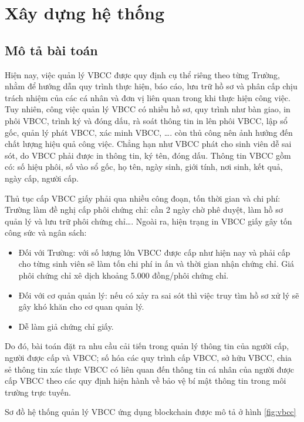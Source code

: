 \chapter{Xây dựng hệ thống}

\section{Mô tả bài toán}

Hiện nay, việc quản lý VBCC được quy định cụ thể riêng theo từng Trường, nhằm để hướng dẫn quy trình thực hiện, báo cáo, lưu trữ hồ sơ và phân cấp chịu trách nhiệm của các cá nhân và đơn vị liên quan trong khi thực hiện công việc.
Tuy nhiên, công việc quản lý VBCC có nhiều hồ sơ, quy trình như bàn giao, in phôi VBCC, trình ký và đóng dấu, rà soát thông tin in lên phôi VBCC, lập sổ gốc, quản lý phát VBCC, xác minh VBCC, \ldots. còn thủ công nên ảnh hưởng đến chất lượng hiệu quả công việc.
Chẳng hạn như VBCC phát cho sinh viên dễ sai sót, do VBCC phải được in thông tin, ký tên, đóng dấu. Thông tin VBCC gồm có: số hiệu phôi, số vào sổ gốc, họ tên, ngày sinh, giới tính, nơi sinh, kết quả, ngày cấp, người cấp. 

Thủ tục cấp VBCC giấy phải qua nhiều công đoạn, tốn thời gian và chi phí: Trường làm đề nghị cấp phôi chứng chỉ: cần 2 ngày chờ phê duyệt, làm hồ sơ quản lý và lưu trữ phôi chứng chỉ\ldots.
Ngoài ra, hiện trạng in VBCC giấy gây tốn công sức và ngân sách:
\begin{itemize}
    \item Đối với Trường: với số lượng lớn VBCC được cấp như hiện nay và phải cấp cho từng sinh viên sẽ làm tốn chi phí in ấn và thời gian nhận chứng chỉ. Giá phôi chứng chỉ xê dịch khoảng 5.000 đồng/phôi chứng chỉ.
    \item Đối với cơ quản quản lý: nếu có xảy ra sai sót thì việc truy tìm hồ sơ xử lý sẽ gây khó khăn cho cơ quan quản lý.
    \item Dễ làm giả chứng chỉ giấy.
\end{itemize}

Do đó, bài toán đặt ra nhu cầu cải tiến trong quản lý thông tin của người cấp, người được cấp và VBCC; số hóa các quy trình cấp VBCC, sở hữu VBCC, chia sẻ thông tin xác thực VBCC có liên quan đến thông tin cá nhân của người được cấp VBCC theo các quy định hiện hành về bảo vệ bí mật thông tin trong môi trường trực tuyến.

Sơ đồ  hệ thống quản lý VBCC ứng dụng blockchain được mô tả ở hình \ref{fig:vbcc}

